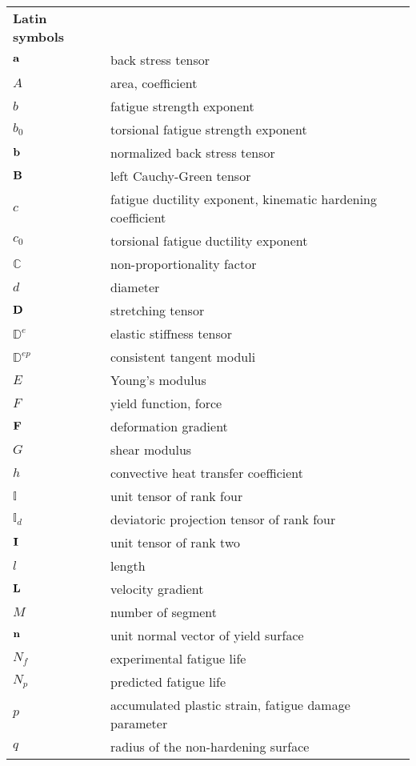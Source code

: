 \begin{table}[htb]
  \centering
    \begin{tabular}{p{3cm}p{10.5cm}}
    \textbf{Latin symbols} & \\
    $\bf{a}$ & back stress tensor \\
    $A$ & area, coefficient \\
    $b$ & fatigue strength exponent \\
    $b_0$ & torsional fatigue strength exponent \\
    $\bf{b}$ & normalized back stress tensor \\
    $\bf{B}$ & left Cauchy-Green tensor \\
    $c$ & fatigue ductility exponent, kinematic hardening coefficient \\
    $c_0$ & torsional fatigue ductility exponent \\
    $\mathbb{C}$ & non-proportionality factor \\
    $d$  & diameter \\
    $\bf{D}$ & stretching tensor \\
    $\mathbb{D}^{e}$ & elastic stiffness tensor \\
    $\mathbb{D}^{ep}$ & consistent tangent moduli \\
    $E$   & Young's modulus \\
    $F$   & yield function, force \\
    $\bf{F}$ & deformation gradient \\
    $G$   & shear modulus \\
    $h$ & convective heat transfer coefficient \\
    $\mathbb{I}$ & unit tensor of rank four \\
    $\mathbb{I}_d$ & deviatoric projection tensor of rank four \\
    $\bf{I}$ & unit tensor of rank two \\
    $l$ & length \\
    $\bf{L}$ & velocity gradient \\
    $M$ & number of segment \\
    $\bf{n}$ & unit normal vector of yield surface \\
    $N_f$ & experimental fatigue life \\
    $N_p$ & predicted fatigue life \\
    $p$   & accumulated plastic strain, fatigue damage parameter \\
    $q$   & radius of the non-hardening surface \\

\end{tabular}
\end{table}
